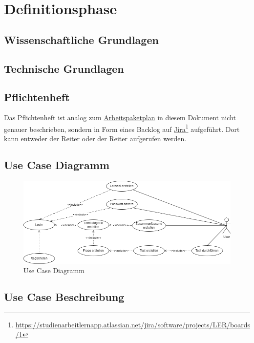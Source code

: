 \section{Definitionsphase}

\subsection{Wissenschaftliche Grundlagen}
\subsection{Technische Grundlagen}


\subsection{Pflichtenheft}
Das Pflichtenheft ist analog zum \hyperref[sec:arbeitspaketplan]{Arbeitspaketplan} in diesem Dokument nicht genauer beschrieben, sondern in Form eines Backlog auf \href{https://studienarbeitlernapp.atlassian.net/jira/software/projects/LER/boards/1}{\underline{Jira}}\footnote{\href{https://studienarbeitlernapp.atlassian.net/jira/software/projects/LER/boards/1}{https://studienarbeitlernapp.atlassian.net/jira/software/projects/LER/boards/1}} aufgeführt. 
Dort kann entweder der Reiter  oder der Reiter  aufgerufen werden. 

\subsection{Use Case Diagramm}


\begin{figure}[H]
    \centering
    \includegraphics[width=1\textwidth]{images/diagramme/UseCase_Diagramm.png}
    \caption{Use Case Diagramm}
    \label{fig:UseCaseDiagramm}
\end{figure}
\newpage
\subsection{Use Case Beschreibung}

